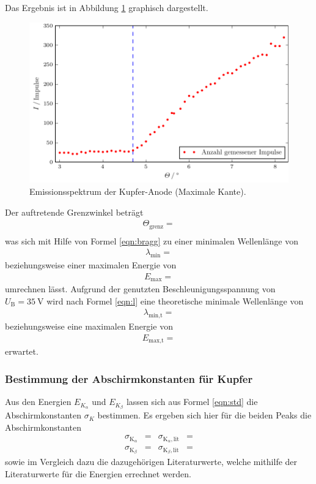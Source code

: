 Das Ergebnis ist in Abbildung \ref{fig:plot3} graphisch dargestellt.
\begin{figure}
  \centering
  \includegraphics{build/plot_3.pdf}
  \caption{Emissionsspektrum der Kupfer-Anode (Maximale Kante).}
  \label{fig:plot3}
\end{figure}
Der auftretende Grenzwinkel beträgt
\begin{align*}
  \Theta_{\text{grenz}} =  \\
\end{align*}
was sich mit Hilfe von Formel \eqref{eqn:bragg} zu einer minimalen Wellenlänge von
\begin{align*}
  \lambda_{\text{min}} = 
\end{align*}
beziehungsweise einer maximalen Energie von
\begin{align*}
  E_{\text{max}} = 
\end{align*}
umrechnen lässt.
Aufgrund der genutzten Beschleunigungsspannung von $U_\text{B} = \SI{35}{\volt}$ wird nach Formel \eqref{eqn:l} eine theoretische minimale Wellenlänge von
\begin{align*}
  \lambda_{\text{min,t}} = 
\end{align*}
beziehungsweise eine maximalen Energie von
\begin{align*}
  E_{\text{max,t}} = 
\end{align*}
erwartet.
\subsubsection{Bestimmung der Abschirmkonstanten für Kupfer}
Aus den Energien $E_{K_\alpha}$ und $E_{K_\beta}$ lassen sich aus Formel \eqref{eqn:std} die Abschirmkonstanten $\sigma_K$ bestimmen.
Es ergeben sich hier für die beiden Peaks die Abschirmkonstanten
\begin{align*}
  \sigma_{\text{K}_{\alpha}} &=  & \sigma_{\text{K}_{\alpha}, \text{lit}} &=  \\
  \sigma_{\text{K}_{\beta}} &=  & \sigma_{\text{K}_{\beta}, \text{lit}} &= 
\end{align*}
sowie im Vergleich dazu die dazugehörigen Literaturwerte, welche mithilfe der Literaturwerte \cite{energie} für die Energien errechnet werden.

